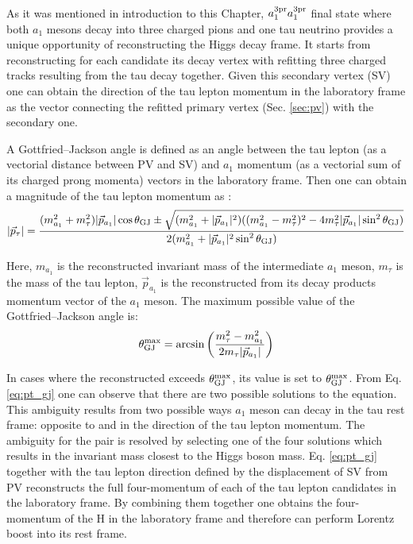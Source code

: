 As it was mentioned in introduction to this Chapter, $a_1^\text{3pr} a_1^\text{3pr}$ final state where both $a_1$ mesons decay into three charged pions and one tau neutrino provides a unique opportunity of reconstructing the Higgs decay frame. It starts from reconstructing for each \tauh candidate its decay vertex with refitting three charged tracks resulting from the tau decay together. Given this secondary vertex (SV) one can obtain the direction of the tau lepton momentum in the laboratory frame as the vector connecting the refitted primary vertex (Sec. \ref{sec:pv}) with the secondary one. 

A Gottfried–Jackson angle \gj is defined as an angle between the tau lepton (as a vectorial distance between PV and SV) and $a_1$ momentum (as a vectorial sum of its charged prong momenta) vectors in the laboratory frame. Then one can obtain a magnitude of the tau lepton momentum as \cite{Cherepanov:2018npf}:
\begin{equation}\label{eq:pt_gj}
    |\vec{p}_\tau| = \dfrac{(m^2_{a_1} + m^2_\tau)|\vec{p}_{a_1}|\cos\theta_\text{GJ} \pm \sqrt{(m^2_{a_1}+|\vec{p}_{a_1}|^2)((m^2_{a_1} - m^2_\tau)^2 - 4m^2_\tau|\vec{p}_{a_1}|\sin^2\theta_\text{GJ})}}{2(m^2_{a_1}+|\vec{p}_{a_1}|^2\sin^2\theta_\text{GJ})}
\end{equation}

Here, $m_{a_1}$ is the reconstructed invariant mass of the intermediate $a_1$ meson, $m_\tau$ is the mass of the tau lepton, $\vec{p}_{a_1}$ is the reconstructed from its decay products momentum vector of the $a_1$ meson. The maximum possible value of the Gottfried–Jackson angle is:
\begin{equation}
    \theta_\text{GJ}^\text{max} = \arcsin\left(\dfrac{m_\tau^2 - m_{a_1}^2}{2m_\tau|\vec{p}_{a_1}|}\right)
\end{equation}

In cases where the reconstructed \gj exceeds $\theta_\text{GJ}^\text{max}$, its value is set to  $\theta_\text{GJ}^\text{max}$. From Eq. \ref{eq:pt_gj} one can observe that there are two possible solutions to the equation. This ambiguity results from two possible ways $a_1$ meson can decay in the tau rest frame: opposite to and in the direction of the tau lepton momentum. The ambiguity for the \aaa pair is resolved by selecting one of the four solutions which results in the invariant mass closest to the Higgs boson mass. Eq. \ref{eq:pt_gj} together with the tau lepton direction defined by the displacement of SV from PV reconstructs the full four-momentum of each of the tau lepton candidates in the laboratory frame. By combining them together one obtains the four-momentum of the H in the laboratory frame and therefore can perform Lorentz boost into its rest frame.

